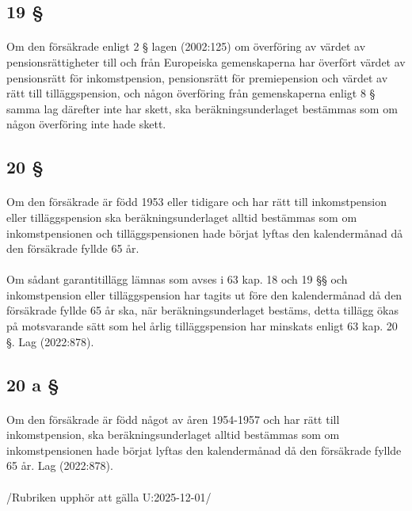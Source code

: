 \documentclass[a4paper,notitlepage,openany,10pt]{book}
\begin{document}
\subsection*{19 §}
\paragraph*{}
Om den försäkrade enligt 2 § lagen (2002:125) om överföring av värdet av pensionsrättigheter till och från Europeiska gemenskaperna har överfört värdet av pensionsrätt för inkomstpension, pensionsrätt för premiepension och värdet av rätt till tilläggspension, och någon överföring från gemenskaperna enligt 8 § samma lag därefter inte har skett, ska beräkningsunderlaget bestämmas som om någon överföring inte hade skett.
\subsection*{20 §}
\paragraph*{}
Om den försäkrade är född 1953 eller tidigare och har rätt till inkomstpension eller tilläggspension ska beräkningsunderlaget alltid bestämmas som om inkomstpensionen och tilläggspensionen hade börjat lyftas den kalendermånad då den försäkrade fyllde 65 år.
\paragraph*{}
Om sådant garantitillägg lämnas som avses i 63 kap. 18 och 19 §§ och inkomstpension eller tilläggspension har tagits ut före den kalendermånad då den försäkrade fyllde 65 år ska, när beräkningsunderlaget bestäms, detta tillägg ökas på motsvarande sätt som hel årlig tilläggspension har minskats enligt 63 kap. 20 §.
Lag (2022:878).
\subsection*{20 a §}
\paragraph*{}
Om den försäkrade är född något av åren 1954-1957 och har rätt till inkomstpension, ska beräkningsunderlaget alltid bestämmas som om inkomstpensionen hade börjat lyftas den kalendermånad då den försäkrade fyllde 65 år.
Lag (2022:878).
\paragraph*{}
/Rubriken upphör att gälla U:2025-12-01/
\end{document}

